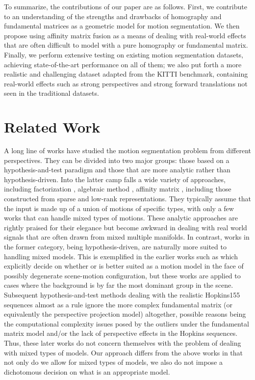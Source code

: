 \documentclass[10pt,twocolumn,letterpaper]{article}
\begin{document}
To summarize, the contributions of our paper are as follows. First, we contribute to an understanding of the strengths and drawbacks of homography and fundamental matrices as a geometric model for motion segmentation. We then propose using affinity matrix fusion as a means of dealing with real-world effects that are often difficult to model with a pure homography or fundamental matrix. Finally, we perform extensive testing on existing motion segmentation datasets, achieving state-of-the-art performance on all of them; we also put forth a more realistic and challenging dataset adapted from the KITTI benchmark, containing real-world effects such as strong perspectives and strong forward translations not seen in the traditional datasets.



\section{Related Work}
A long line of works have studied the motion segmentation problem from different perspectives. They can be divided into two major groups: those based on a hypothesis-and-test paradigm and those that are more analytic rather than hypothesis-driven. Into the latter camp falls a wide variety of approaches, including factorization \cite{boult1991factorization,costeira1998multibody, gear1998multibody,gruber2004multibody,tomasi1992shape}, algebraic method \cite{Rao2010,vidal2004motion,vidal2005generalized,Vidal2008}, affinity matrix \cite{lauer2009spectral,yan2006general}, including those constructed from sparse \cite{Elhamifar2013} and low-rank \cite{liu2013robust} representations. They typically assume that the input is made up of a union of motions of specific types, with only a few works \cite{goh2007segmenting,Rao2010} that can handle mixed types of motions. These analytic approaches are rightly praised for their elegance but become awkward in dealing with real world signals that are often drawn from mixed multiple manifolds. In contrast, works in the former category, being hypothesis-driven, are naturally more suited to handling mixed models. This is exemplified in the earlier works such as \cite{sugaya2004geometric,Torr1998} which explicitly decide on whether  or  is better suited as a motion model in the face of possibly degenerate scene-motion configuration, but these works are applied to cases where the background is by far the most dominant group in the scene. Subsequent hypothesis-and-test methods \cite{Chin2009,chin2010accelerated,lazic2009floss} dealing with the realistic Hopkins155 \cite{Tron2007} sequences almost as a rule ignore the more complex fundamental matrix (or equivalently the perspective projection model) altogether, possible reasons being the computational complexity issues posed by the outliers under the fundamental matrix model and/or the lack of perspective effects in the Hopkins sequences. Thus, these later works do not concern themselves with the problem of dealing with mixed types of models. Our approach differs from the above works in that not only do we allow for mixed types of models, we also do not impose a dichotomous decision on what is an appropriate model.  
\end{document}
